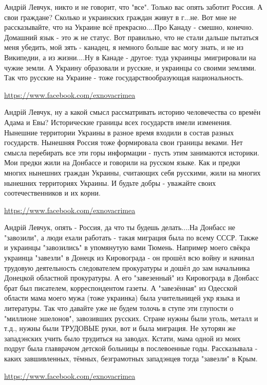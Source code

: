 \documentclass[a4paper,11pt]{extreport}
\begin{document}
\begin{itemize}
\begin{itemize}
Андрій Левчук, никто и не говорит, что "все". Только вас опять заботит Россия. А свои граждане? Сколько и украинских граждан живут в г...не. Вот мне не рассказывайте, что на Украине всё прекрасно....Про Канаду - смешно, конечно. Домашний язык - это ж не статус. Вот правильно, что не стали дальше пытаться меня убедить, мой зять - канадец, я немного больше вас могу знать, и не из Википедии, а из жизни....Ну в Канаде - другое: туда украинцы эмигрировали на чужие земли. А Украину образовали и русские, и украинцы со своими землями. Так что русские на Украине - тоже государствообразующая национальность.

\url{https://www.facebook.com/exnovacrimea}

Андрій Левчук, ну а какой смысл рассматривать историю человечества со времён Адама и Евы? Исторические границы всех государств имели изменения. Нынешние территории Украины в разное время входили в состав разных государств. Нынешняя Россия тоже формировала свои границы веками. Нет смысла перебирать все эти горы информации - пусть этим занимаются историки. Мои предки жили на Донбассе и говорили на русском языке. Как и предки многих нынешних граждан Украины, считающих себя русскими, жили на многих нынешних территориях Украины. И будьте добры - уважайте своих соотечественников и их корни.

\url{https://www.facebook.com/exnovacrimea}

Андрій Левчук, опять - Россия, да что ты будешь делать....На Донбасс не "завозили", а люди ехали работать - такая миграция была по всему СССР. Также и украинцы "завозились" в упомянутую вами Тюмень. Например моего свёкра украинца "завезли" в Донецк из Кировограда - он прошёл всю войну и начинал трудовую деятельность следователем прокуратуры и дошёл до зам начальника Донецкой областной прокуратуры. А его "завезенный" из Кировограда в Донбасс брат был писателем, корреспондентом газеты. А "завезённая" из Одесской области мама моего мужа (тоже украинка) была учительницей укр языка и литературы. Так что давайте уже не будем толочь в ступе эти глупости о "миллионе эшелонов", завозивших русских. Стране нужны были уголь, металл и т.д., нужны были ТРУДОВЫЕ руки, вот и была миграция. Не хуторян же западэнских учить было трудиться на заводах. Кстати, мама одной из моих подруг была главврачом детской больницы в послевоенные годы. Рассказывала - каких завшивленных, тёмных, безграмотных западэнцев тогда "завезли" в Крым.

\url{https://www.facebook.com/exnovacrimea}


\end{itemize}
\end{itemize}
\end{document}
